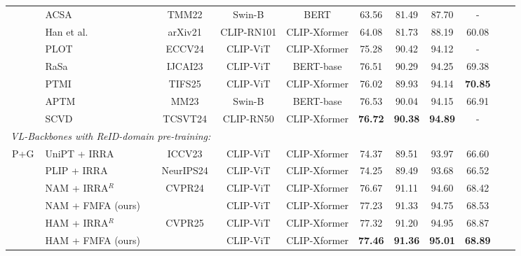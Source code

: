 \documentclass[acmsmall]{acmart}
\begin{document}
\begin{table}[t]
{\begin{tabular}{c|l|ccc|cccccc}
    & ACSA \cite{ji2022asymmetric} & TMM22 & Swin-B & BERT & 63.56 & 81.49 & 87.70 & - \\
    & Han et al. \cite{han2021text} & arXiv21 & CLIP-RN101 & CLIP-Xformer & 64.08 & 81.73 & 88.19 & 60.08 \\
    & PLOT \cite{park2024plot} & ECCV24 & CLIP-ViT & CLIP-Xformer & 75.28 & 90.42 & 94.12 & - \\
    & RaSa \cite{bai2023rasa} & IJCAI23  & CLIP-ViT & BERT-base & 76.51 & 90.29 & 94.25 & 69.38 \\
    & PTMI \cite{lu2025prompt} & TIFS25 & CLIP-ViT & CLIP-Xformer & 76.02 & 89.93 & 94.14 & \textbf{70.85} \\
    & APTM \cite{yang2023towards} & MM23 & Swin-B & BERT-base & 76.53 & 90.04 & 94.15 & 66.91 \\
    & SCVD \cite{wei2024fine} & TCSVT24 & CLIP-RN50 & CLIP-Xformer & \textbf{76.72} & \textbf{90.38} & \textbf{94.89} & - \\
    \hline
    \multicolumn{3}{l}{\textit{VL-Backbones with ReID-domain pre-training:}} \\
    \hline
    \multirow{6}{*}{P+G}
    & UniPT \cite{shao2023unified} + IRRA \cite{jiang2023cross} & ICCV23 & CLIP-ViT & CLIP-Xformer & 74.37 & 89.51 & 93.97 & 66.60 \\
    & PLIP \cite{zuo2024plip} + IRRA \cite{jiang2023cross} & NeurIPS24 & CLIP-ViT & CLIP-Xformer & 74.25 & 89.49 & 93.68 & 66.52 \\
    & NAM \cite{tan2024harnessing} + IRRA$^R$ & CVPR24 & CLIP-ViT & CLIP-Xformer & 76.67 & 91.11 & 94.60 & 68.42 \\
    & NAM \cite{tan2024harnessing} + FMFA (ours) & & CLIP-ViT & CLIP-Xformer & 77.23 & 91.33 & 94.75 & 68.53 \\
    & HAM \cite{jiang2025modeling} + IRRA$^R$ & CVPR25 & CLIP-ViT & CLIP-Xformer & 77.32 & 91.20 & 94.95 & 68.87 \\
    & HAM \cite{jiang2025modeling} + FMFA (ours) & & CLIP-ViT & CLIP-Xformer & \textbf{77.46} & \textbf{91.36} & \textbf{95.01} & \textbf{68.89} \\
     \hline
  \end{tabular}
  }
\end{table}
\end{document}
